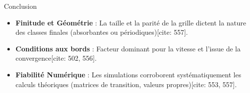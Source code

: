 \documentclass{beamer}
\begin{document}
\begin{frame}{Conclusion}
  \begin{itemize}
    \item \textbf{Finitude et Géométrie} : La taille et la parité de la grille dictent la nature des classes finales (absorbantes ou périodiques)[cite: 557].
    \item \textbf{Conditions aux bords} : Facteur dominant pour la vitesse et l'issue de la convergence[cite: 502, 556].
    \item \textbf{Fiabilité Numérique} : Les simulations corroborent systématiquement les calculs théoriques (matrices de transition, valeurs propres)[cite: 553, 557].
  \end{itemize}
\end{frame}
\end{document}

